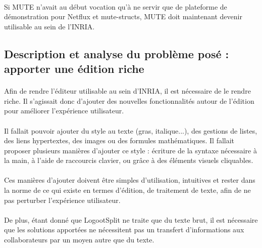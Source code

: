 \documentclass[12pt]{article}
\begin{document}
\paragraph{}
Si MUTE n'avait au début vocation qu'à ne servir que de plateforme de démonstration pour Netflux et mute-structs, MUTE doit maintenant devenir utilisable au sein de l'INRIA.

\subsection{Description et analyse du problème posé : apporter une édition riche}
\paragraph{}
Afin de rendre l'éditeur utilisable au sein d'INRIA, il est nécessaire de le rendre riche. Il s'agissait donc d'ajouter des nouvelles fonctionnalités autour de l'édition pour améliorer l'expérience utilisateur.
\paragraph{}
Il fallait pouvoir ajouter du style au texte (gras, italique...), des gestions de listes, des liens hypertextes, des images ou des formules mathématiques. Il fallait proposer plusieurs manières d'ajouter ce style : écriture de la syntaxe nécessaire à la main, à l'aide de raccourcis clavier, ou grâce à des éléments visuels cliquables.
\paragraph{}
Ces manières d'ajouter doivent être simples d'utilisation, intuitives et rester dans la norme de ce qui existe en termes d'édition, de traitement de texte, afin de ne pas perturber l'expérience utilisateur.
\paragraph{}
De plus, étant donné que LogootSplit ne traite que du texte brut, il est nécessaire que les solutions apportées ne nécessitent pas un transfert d'informations aux collaborateurs par un moyen autre que du texte.
\end{document}
